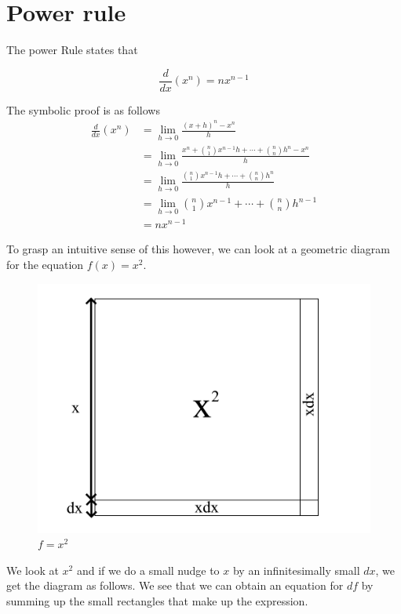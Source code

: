 \documentclass[a4paper,12pt,oneside]{book}
\begin{document}
\section{Power rule}

The power Rule states that

$$\frac{d}{dx}(x^n)=nx^{n-1}$$

 \noindent The symbolic proof is as follows
$$
\begin{aligned}
\frac{d}{dx}(x^n)&=\lim_{h\to 0}\frac{(x+h)^n-x^n}{h}\\
&=\lim_{h\to 0}\frac{x^n+\binom{n}{1}x^{n-1}h+\cdots +\binom{n}{n}h^n-x^n}{h}\\
&=\lim_{h\to 0}\frac{\binom{n}{1}x^{n-1}h+\cdots +\binom{n}{n}h^n}{h}\\
&=\lim_{h\to 0}\binom{n}{1}x^{n-1}+\cdots +\binom{n}{n}h^{n-1}\\
&=nx^{n-1}
\end{aligned}
$$

 \noindent To grasp an intuitive sense of this however, we can look at a geometric diagram for the equation $f(x)=x^2$.

\begin{figure}[H]
    \begin{center}
        \includegraphics[scale=0.35]{img/zayan/pr1.png}
        \caption{$f=x^2$}
        \label{fig:pr1}
    \end{center}
\end{figure}

 \noindent We look at $x^2$ and if we do a small nudge to $x$ by an infinitesimally small $dx$, we get the diagram as follows. We see that we can obtain an equation for $df$ by summing up the small rectangles that make up the expression.
\end{document}
